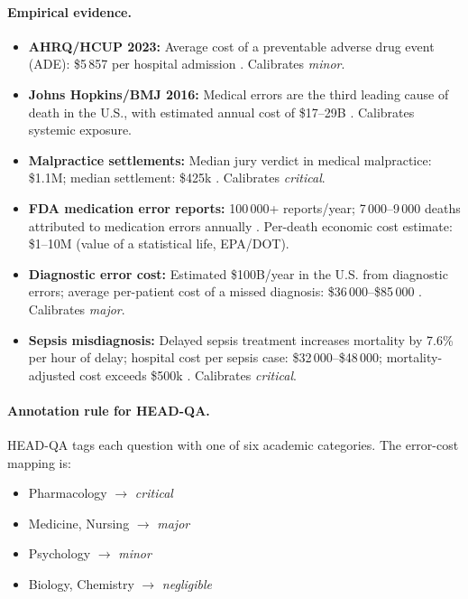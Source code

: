 \paragraph{Empirical evidence.}
\begin{itemize}
\item \textbf{AHRQ/HCUP 2023:} Average cost of a preventable adverse
    drug event (ADE): \$5\,857 per hospital admission
    \citep{ahrq2023ade}. Calibrates \textit{minor}.
\item \textbf{Johns Hopkins/BMJ 2016:} Medical errors are the third
    leading cause of death in the U.S., with estimated annual cost of
    \$17--29B \citep{makary2016}. Calibrates systemic exposure.
\item \textbf{Malpractice settlements:} Median jury verdict in medical
    malpractice: \$1.1M; median settlement: \$425k
    \citep{diederich2023}. Calibrates \textit{critical}.
\item \textbf{FDA medication error reports:} 100\,000+ reports/year;
    7\,000--9\,000 deaths attributed to medication errors annually
    \citep{fda2023mederrors}. Per-death economic cost estimate:
    \$1--10M (value of a statistical life, EPA/DOT).
\item \textbf{Diagnostic error cost:} Estimated \$100B/year in the U.S.
    from diagnostic errors; average per-patient cost of a missed
    diagnosis: \$36\,000--\$85\,000 \citep{newmantoker2024burden}.
    Calibrates \textit{major}.
\item \textbf{Sepsis misdiagnosis:} Delayed sepsis treatment increases
    mortality by 7.6\% per hour of delay; hospital cost per sepsis
    case: \$32\,000--\$48\,000; mortality-adjusted cost exceeds \$500k
    \citep{seymour2017sepsis}. Calibrates \textit{critical}.
\end{itemize}

\paragraph{Annotation rule for HEAD-QA.}
HEAD-QA tags each question with one of six academic categories.
The error-cost mapping is:
\begin{itemize}
\item Pharmacology $\to$ \textit{critical}
\item Medicine, Nursing $\to$ \textit{major}
\item Psychology $\to$ \textit{minor}
\item Biology, Chemistry $\to$ \textit{negligible}
\end{itemize}

